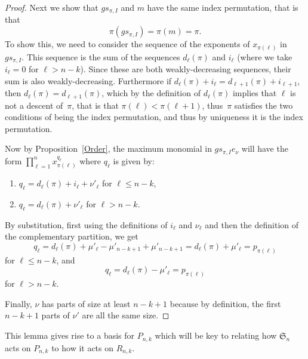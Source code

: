 \documentclass[10pt]{article}
\begin{document}
\begin{lemm}
\begin{proof}
	Next we show that $gs_{\pi,I}$ and $m$ have the same index permutation, that is that 
		\begin{equation}
\pi(gs_{\pi,I})=\pi(m)=\pi.
\end{equation}
 To show this, we need to consider the sequence of the exponents of $x_{\pi(\ell)}$ in $gs_{\pi,I}$. This sequence is the sum 
of the sequences $d_\ell(\pi)$ and $i_\ell$ (where we take $i_\ell=0$ for $\ell>n-k$). Since these are both 
weakly-decreasing sequences, their sum is also weakly-decreasing. Furthermore if 
$d_\ell(\pi)+i_\ell=d_{\ell+1}(\pi)+i_{\ell+1}$, then $d_\ell(\pi)=d_{\ell+1}(\pi)$, which by the definition of $d_\ell(\pi)$ 
implies that $\ell$ is not a descent of~$\pi$, that is that $\pi(\ell)<\pi(\ell+1)$, thus~$\pi$ satisfies the two 
conditions of being the index permutation, and thus by uniqueness it is the index permutation.



	Now by Proposition~\ref{Order}, the maximum monomial in $gs_{\pi,I}e_\nu$ will have the form $\prod_{\ell=1}^n 
x_{\pi(\ell)}^{q_{\ell}}$ where $q_\ell$ is given by:

	\begin{enumerate}

		\item $q_\ell=d_\ell(\pi)+i_\ell+\nu'_\ell$ for $\ell\leq n-k$,

		\item $q_\ell=d_\ell(\pi)+\nu'_\ell$ for $\ell> n-k$.

	\end{enumerate}

By substitution, first using the definitions of $i_\ell$ and $\nu_\ell$ and then the definition of the complementary partition, 
we get 
		\begin{equation}
q_\ell=d_\ell(\pi)+\mu'_\ell-\mu'_{n-k+1}+\mu'_{n-k+1}=d_\ell(\pi)+\mu'_\ell=p_{\pi(\ell)}
		\end{equation}
 for $\ell\leq n-k$, and 
		\begin{equation}
q_\ell=d_\ell(\pi)-\mu'_\ell=p_{\pi(\ell)}
\end{equation}
for $\ell>n-k$.


Finally, $\nu$ has parts of size at least $n-k+1$ because by definition, the first $n-k+1$ parts of $\nu'$ are all the same size.
	\end{proof}
\end{lemm}

This lemma gives rise to a basis for $P_{n,k}$ which will be key to relating how $\mathfrak{S}_n$ acts on $P_{n,k}$ to how it 
acts on $R_{n,k}$.
\end{document}
